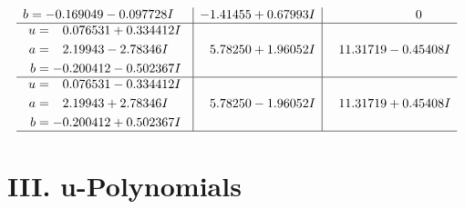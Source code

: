 \documentclass[1p]{elsarticle_modified}
\theoremstyle{definition}
\begin{document}
$$\begin{array}{c|c|c}
\begin{aligned}
b &= -0.169049 - 0.097728 I\end{aligned}
 & -1.41455 + 0.67993 I & \phantom{-0.000000 } 0 \\ \hline\begin{aligned}
u &= \phantom{-}0.076531 + 0.334412 I \\
a &= \phantom{-}2.19943 - 2.78346 I \\
b &= -0.200412 - 0.502367 I\end{aligned}
 & \phantom{-}5.78250 + 1.96052 I & \phantom{-}11.31719 - 0.45408 I \\ \hline\begin{aligned}
u &= \phantom{-}0.076531 - 0.334412 I \\
a &= \phantom{-}2.19943 + 2.78346 I \\
b &= -0.200412 + 0.502367 I\end{aligned}
 & \phantom{-}5.78250 - 1.96052 I & \phantom{-}11.31719 + 0.45408 I\\
 \hline 
 \end{array}$$\newpage
\newpage\renewcommand{\arraystretch}{1}
\centering \section*{ III. u-Polynomials}
\end{document}
